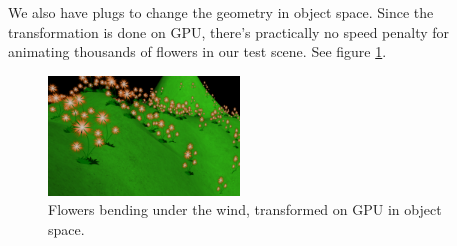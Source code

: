 \documentclass{egpubl}
\begin{document}


We also have plugs to change the geometry in object space.
Since the transformation is done on GPU, there's practically
no speed penalty for animating thousands of flowers in our test scene.
See figure \ref{fig_flowers}.

\setcounter{figure}{8}
\begin{figure}[H]
  \centering
  \includegraphics[width=2in]{flowers}
  \caption{Flowers bending under the wind, transformed on GPU in object space.}
  \label{fig_flowers}
\end{figure}
\end{document}
